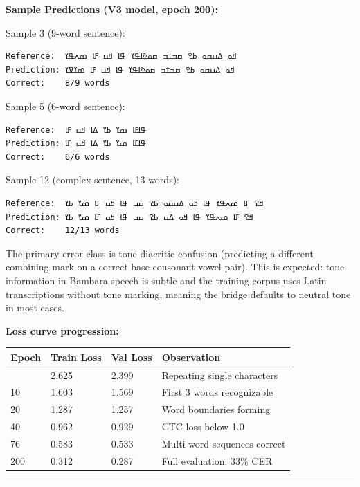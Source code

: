 \documentclass[
]{article}
\newcounter{none} %
\begin{document}
\textbf{Sample Predictions (V3 model, epoch 200):}

Sample 3 (9-word sentence):

\begin{verbatim}
Reference:  ߞߋ ߡߎߛߋ ߕߐ ߛߏߙߏ ߛߋߢߊߟߌ ߟߊ ߞߎ ߓߊ ߘߍߟߌ
Prediction: ߞߋ ߡߎߛߋ ߕߐ ߛߏߙߏ ߛߋߢߊߟߌ ߟߊ ߞߎ ߓߊ ߘߌߜߌ
Correct:    8/9 words
\end{verbatim}

Sample 5 (6-word sentence):

\begin{verbatim}
Reference:  ߟߊߓߊ ߘߌ ߕߌ ߡߊ ߞߎ ߓߊ
Prediction: ߟߊߓߊ ߘߌ ߕߌ ߡߊ ߞߎ ߓߊ
Correct:    6/6 words
\end{verbatim}

Sample 12 (complex sentence, 13 words):

\begin{verbatim}
Reference:  ߞߐ ߓߊ ߘߍߟߌ ߟߊ ߞߋ ߡߎߛߋ ߕߐ ߛߏ ߟߊ ߞߎ ߓߊ ߘߌ ߕߌ
Prediction: ߞߐ ߓߊ ߘߍߟߌ ߟߊ ߞߋ ߡߎ ߕߐ ߛߏ ߟߊ ߞߎ ߓߊ ߘߌ ߕߌ
Correct:    12/13 words
\end{verbatim}

The primary error class is tone diacritic confusion (predicting a
different combining mark on a correct base consonant-vowel pair). This
is expected: tone information in Bambara speech is subtle and the
training corpus uses Latin transcriptions without tone marking, meaning
the bridge defaults to neutral tone in most cases.

\textbf{Loss curve progression:}

{\def\LTcaptype{none} %
\begin{longtable}[]{@{}llll@{}}
\toprule\noalign{}
Epoch & Train Loss & Val Loss & Observation \\
\midrule\noalign{}
\endhead
\bottomrule\noalign{}
\endlastfoot
1 & 2.625 & 2.399 & Repeating single characters \\
10 & 1.603 & 1.569 & First 3 words recognizable \\
20 & 1.287 & 1.257 & Word boundaries forming \\
40 & 0.962 & 0.929 & CTC loss below 1.0 \\
76 & 0.583 & 0.533 & Multi-word sequences correct \\
200 & 0.312 & 0.287 & Full evaluation: 33\% CER \\
\end{longtable}
}

\begin{center}\rule{0.5\linewidth}{0.5pt}\end{center}
\end{document}
